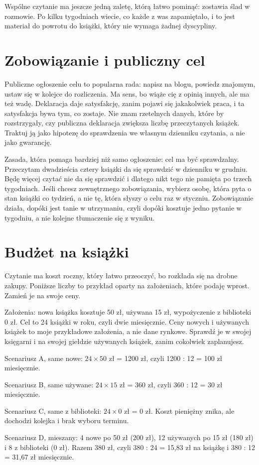 Wspólne czytanie ma jeszcze jedną zaletę, którą łatwo pominąć: zostawia ślad w rozmowie. Po kilku tygodniach wiecie, co każde z was zapamiętało, i to jest materiał do powrotu do książki, który nie wymaga żadnej dyscypliny.

\section{Zobowiązanie i publiczny cel}

Publiczne ogłoszenie celu to popularna rada: napisz na blogu, powiedz znajomym, ustaw się w kolejce do rozliczenia. Ma sens, bo wiąże cię z opinią innych, ale ma też wadę. Deklaracja daje satysfakcję, zanim pojawi się jakakolwiek praca, i ta satysfakcja bywa tym, co zostaje. Nie znam rzetelnych danych, które by rozstrzygały, czy publiczna deklaracja zwiększa liczbę przeczytanych książek. Traktuj ją jako hipotezę do sprawdzenia we własnym dzienniku czytania, a nie jako gwarancję.

Zasada, która pomaga bardziej niż samo ogłoszenie: cel ma być sprawdzalny. \glqq Przeczytam dwadzieścia cztery książki\grqq{} da się sprawdzić w dzienniku w grudniu. \glqq Będę więcej czytać\grqq{} nie da się sprawdzić i dlatego nikt tego nie pamięta po trzech tygodniach. Jeśli chcesz zewnętrznego zobowiązania, wybierz osobę, która pyta o stan książki co tydzień, a nie tę, która słyszy o celu raz w styczniu. Zobowiązanie działa, dopóki jest tanie w utrzymaniu, czyli dopóki kosztuje jedno pytanie w tygodniu, a nie kolejne tłumaczenie się z wyniku.

\section{Budżet na książki}

Czytanie ma koszt roczny, który łatwo przeoczyć, bo rozkłada się na drobne zakupy. Poniższe liczby to przykład oparty na założeniach, które podaję wprost. Zamień je na swoje ceny.

Założenia: nowa książka kosztuje 50 zł, używana 15 zł, wypożyczenie z biblioteki 0 zł. Cel to 24 książki w roku, czyli dwie miesięcznie. Ceny nowych i używanych książek to moje przykładowe założenia, a nie dane rynkowe. Sprawdź je w swojej księgarni i na swojej giełdzie używanych książek, zanim cokolwiek zaplanujesz.

\begin{przyklad}
Scenariusz A, same nowe: $24 \times 50$ zł = 1200 zł, czyli 1200 : 12 = 100 zł miesięcznie.

Scenariusz B, same używane: $24 \times 15$ zł = 360 zł, czyli 360 : 12 = 30 zł miesięcznie.

Scenariusz C, same z biblioteki: $24 \times 0$ zł = 0 zł. Koszt pieniężny znika, ale dochodzi kolejka i brak wyboru terminu.

Scenariusz D, mieszany: 4 nowe po 50 zł (200 zł), 12 używanych po 15 zł (180 zł) i 8 z biblioteki (0 zł). Razem 380 zł, czyli 380 : 24 = 15,83 zł na książkę i 380 : 12 = 31,67 zł miesięcznie.
\end{przyklad}

